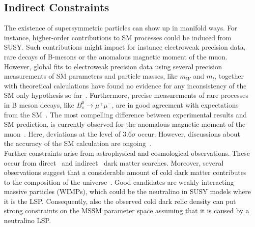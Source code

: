 \subsection{Indirect Constraints}
\label{subsec:susy_indirect}
The existence of supersymmetric particles can show up in manifold ways. For instance, higher-order contributions to SM processes could be induced from SUSY. Such contributions might impact for instance electroweak precision data, rare decays of B-mesons or the anomalous magnetic moment of the muon. However, global fits to electroweak precision data using several precision measurements of SM parameters and particle masses, like $m_W$ and $m_t$, together with theoretical calculations have found no evidence for any inconsistency of the SM only hypothesis so far~\cite{LEP-2, Erler:2012wz, Ciuchini:2013pca, Baak:2014ora}. Furthermore, precise measurements of rare processes in B meson decays, like $B_s^0 \rightarrow \mu^+ \mu^-$, are in good agreement with expectations from the SM~\cite{Chatrchyan:2013bka, Aaij:2013aka, CMS-PAS-BPH-13-007}. The most compelling difference between experimental results and SM prediction, is currently observed for the anomalous magnetic moment of the muon~\cite{Bennett:2006fi, Hagiwara:2011af, Agashe:2014kda}. Here, deviations at the level of $3.6\sigma$ occur. However, discussions about the accuracy of the SM calculation are ongoing~\cite{Davier:2010nc}. \\  
Further constraints arise from astrophysical and cosmological observations. These occur from direct~\cite{cerdeno2010direct} and indirect~\cite{Cirelli:2010xx} dark matter searches. Moreover, several observations suggest that a considerable amount of cold dark matter contributes to the composition of the universe~\cite{wmap, Ade:2013zuv}. Good candidates are weakly interacting massive particles (WIMPs), which could be the neutralino in SUSY models where it is the LSP. Consequently, also the observed cold dark relic density can put strong constraints on the MSSM parameter space assuming that it is caused by a neutralino LSP.      
